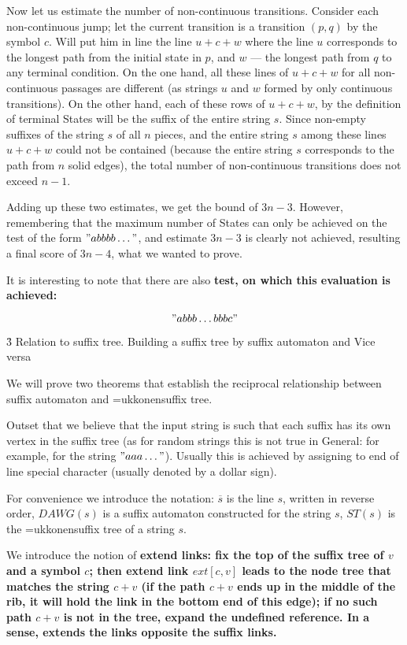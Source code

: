 Now let us estimate the number of non-continuous transitions. Consider each non-continuous jump; let the current transition is a transition $(p,q)$ by the symbol $c$. Will put him in line the line $u+c+w$ where the line $u$ corresponds to the longest path from the initial state in $p$, and $w$ --- the longest path from $q$ to any terminal condition. On the one hand, all these lines of $u+c+w$ for all non-continuous passages are different (as strings $u$ and $w$ formed by only continuous transitions). On the other hand, each of these rows of $u+c+w$, by the definition of terminal States will be the suffix of the entire string $s$. Since non-empty suffixes of the string $s$ of all $n$ pieces, and the entire string $s$ among these lines $u+c+w$ could not be contained (because the entire string $s$ corresponds to the path from $n$ solid edges), the total number of non-continuous transitions does not exceed $n-1$.

Adding up these two estimates, we get the bound of $3n-3$. However, remembering that the maximum number of States can only be achieved on the test of the form $"abbbb \ldots "$, and estimate $3n-3$ is clearly not achieved, resulting a final score of $3n-4$, what we wanted to prove.

It is interesting to note that there are also \bf{test, on which this evaluation is achieved}:

$$ "abbb \ldots bbbc" $$


\h3{ Relation to suffix tree. Building a suffix tree by suffix automaton and Vice versa }

We will prove two theorems that establish the reciprocal relationship between suffix automaton and \algohref=ukkonen{suffix tree}.

Outset that we believe that the input string is such that each suffix has its own vertex in the suffix tree (as for random strings this is not true in General: for example, for the string $"aaa \ldots"$). Usually this is achieved by assigning to end of line special character (usually denoted by a dollar sign).

For convenience we introduce the notation: $\overline{s}$ is the line $s$, written in reverse order, $DAWG(s)$ is a suffix automaton constructed for the string $s$, $ST(s)$ is the \algohref=ukkonen{suffix tree} of a string $s$.

We introduce the notion of \bf{extend links}: fix the top of the suffix tree of $v$ and a symbol $c$; then extend link $ext[c,v]$ leads to the node tree that matches the string $c+v$ (if the path $c+v$ ends up in the middle of the rib, it will hold the link in the bottom end of this edge); if no such path $c+v$ is not in the tree, expand the undefined reference. In a sense, extends the links opposite the suffix links.

